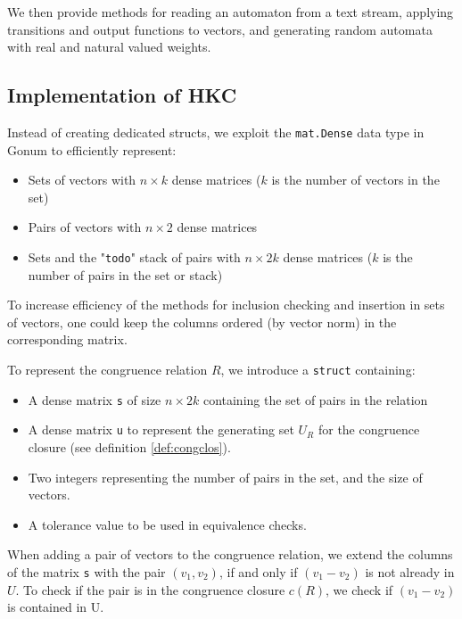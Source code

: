 We then provide methods for reading an automaton from a text stream, applying transitions
and output functions to vectors, and generating random automata with real and natural valued weights.


\subsection{Implementation of HKC}
Instead of creating dedicated structs,
we exploit the \texttt{mat.Dense} data type in Gonum to efficiently represent:
\begin{itemize}
    \item Sets of vectors with $n \times k$ dense matrices ($k$ is the number of vectors in the set)
    \item Pairs of vectors with $n \times 2$ dense matrices
    \item Sets and the "\texttt{todo}" stack of pairs with $n \times 2k$ dense matrices ($k$ is the number of pairs in the set or stack)
\end{itemize}

To increase efficiency of the methods for inclusion checking and insertion in sets of vectors,
one could keep the columns ordered (by vector norm) in the corresponding matrix. 

To represent the congruence relation $R$, we introduce a \texttt{struct} containing:
\begin{itemize}
    \item A dense matrix \texttt{s} of size $n \times 2k$ containing the set of pairs in the relation
    \item A dense matrix \texttt{u} to represent the generating set $U_R$ for the congruence closure (see definition \ref{def:congclos}).
    \item Two integers representing the number of pairs in the set, and the size of vectors.
    \item A tolerance value to be used in equivalence checks.
\end{itemize}

When adding a pair of vectors to the congruence relation, we extend the columns
of the matrix \texttt{s} with the pair $(v_1, v_2)$, if and only if $(v_1 - v_2)$ 
is not already in $U$. To check if the pair is in the congruence closure $c(R)$, 
we check if $(v_1 - v_2)$ is contained in U.




